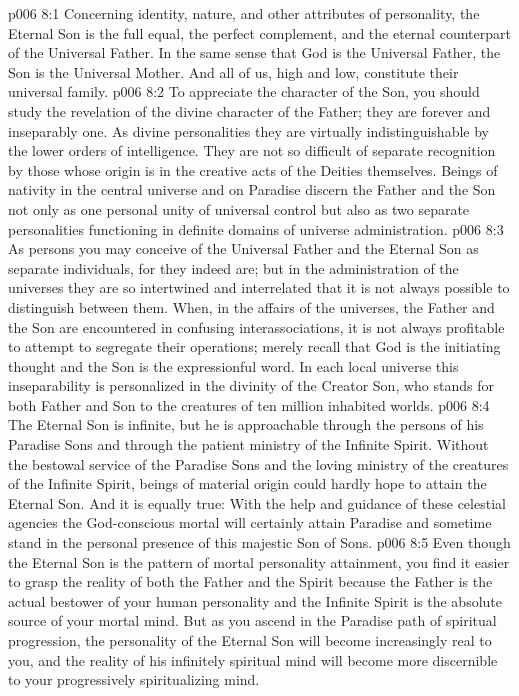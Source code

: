\vs p006 8:1 Concerning identity, nature, and other attributes of personality, the Eternal Son is the full equal, the perfect complement, and the eternal counterpart of the Universal Father. In the same sense that God is the Universal Father, the Son is the Universal Mother. And all of us, high and low, constitute their universal family.
\vs p006 8:2 To appreciate the character of the Son, you should study the revelation of the divine character of the Father; they are forever and inseparably one. As divine personalities they are virtually indistinguishable by the lower orders of intelligence. They are not so difficult of separate recognition by those whose origin is in the creative acts of the Deities themselves. Beings of nativity in the central universe and on Paradise discern the Father and the Son not only as one personal unity of universal control but also as two separate personalities functioning in definite domains of universe administration.
\vs p006 8:3 As persons you may conceive of the Universal Father and the Eternal Son as separate individuals, for they indeed are; but in the administration of the universes they are so intertwined and interrelated that it is not always possible to distinguish between them. When, in the affairs of the universes, the Father and the Son are encountered in confusing interassociations, it is not always profitable to attempt to segregate their operations; merely recall that God is the initiating thought and the Son is the expressionful word. In each local universe this inseparability is personalized in the divinity of the Creator Son, who stands for both Father and Son to the creatures of ten million inhabited worlds.
\vs p006 8:4 The Eternal Son is infinite, but he is approachable through the persons of his Paradise Sons and through the patient ministry of the Infinite Spirit. Without the bestowal service of the Paradise Sons and the loving ministry of the creatures of the Infinite Spirit, beings of material origin could hardly hope to attain the Eternal Son. And it is equally true: With the help and guidance of these celestial agencies the God\hyp{}conscious mortal will certainly attain Paradise and sometime stand in the personal presence of this majestic Son of Sons.
\vs p006 8:5 \pc Even though the Eternal Son is the pattern of mortal personality attainment, you find it easier to grasp the reality of both the Father and the Spirit because the Father is the actual bestower of your human personality and the Infinite Spirit is the absolute source of your mortal mind. But as you ascend in the Paradise path of spiritual progression, the personality of the Eternal Son will become increasingly real to you, and the reality of his infinitely spiritual mind will become more discernible to your progressively spiritualizing mind.
